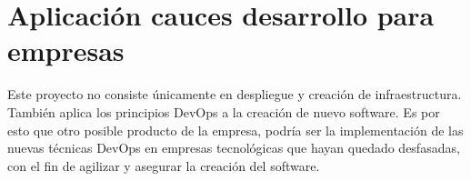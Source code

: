 \section{Aplicación cauces desarrollo para empresas}
\begin{text}
	Este proyecto no consiste únicamente en despliegue y creación de infraestructura. También aplica los principios DevOps a la creación de nuevo software. Es por esto que otro posible producto de la empresa, podría ser la implementación de las nuevas técnicas DevOps en empresas tecnológicas que hayan quedado desfasadas, con el fin de agilizar y asegurar la creación del software.
\end{text}